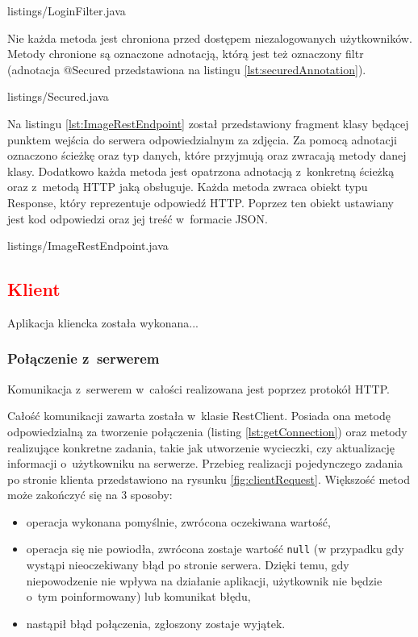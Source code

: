 
{listings/LoginFilter.java}

Nie każda metoda jest chroniona przed dostępem niezalogowanych użytkowników. Metody chronione są oznaczone adnotacją, którą jest też oznaczony filtr (adnotacja @Secured przedstawiona na listingu \ref{lst:securedAnnotation}).


{listings/Secured.java}

Na listingu \ref{lst:ImageRestEndpoint} został przedstawiony fragment klasy będącej punktem wejścia do serwera odpowiedzialnym za zdjęcia. Za pomocą adnotacji oznaczono ścieżkę oraz typ danych, które przyjmują oraz zwracają metody danej klasy. Dodatkowo każda metoda jest opatrzona adnotacją z~konkretną ścieżką oraz z~metodą HTTP jaką obsługuje. Każda metoda zwraca obiekt typu Response, który reprezentuje odpowiedź HTTP. Poprzez ten obiekt ustawiany jest kod odpowiedzi oraz jej treść w~formacie JSON.


{listings/ImageRestEndpoint.java}

\subsection{\textcolor{red}{Klient}}
Aplikacja kliencka została wykonana...


\subsubsection{Połączenie z~serwerem}
Komunikacja z~serwerem w~całości realizowana jest poprzez protokół HTTP. 

Całość
komunikacji zawarta została w~klasie RestClient. Posiada ona metodę
odpowiedzialną za tworzenie połączenia (listing \ref{lst:getConnection}) oraz
metody realizujące konkretne zadania, takie jak utworzenie wycieczki, czy
aktualizację informacji o~użytkowniku na serwerze. Przebieg realizacji pojedynczego zadania po stronie klienta przedstawiono na rysunku \ref{fig:clientRequest}. Większość metod może zakończyć się na 3 sposoby:
\begin{itemize}
	\item operacja wykonana pomyślnie, zwrócona oczekiwana wartość,
	\item operacja się nie powiodła, zwrócona zostaje wartość \texttt{null} (w przypadku gdy wystąpi nieoczekiwany błąd po stronie serwera. Dzięki temu, gdy niepowodzenie nie wpływa na działanie aplikacji, użytkownik nie będzie o~tym poinformowany) lub komunikat błędu,
	\item nastąpił błąd połączenia, zgłoszony zostaje wyjątek.
\end{itemize}

